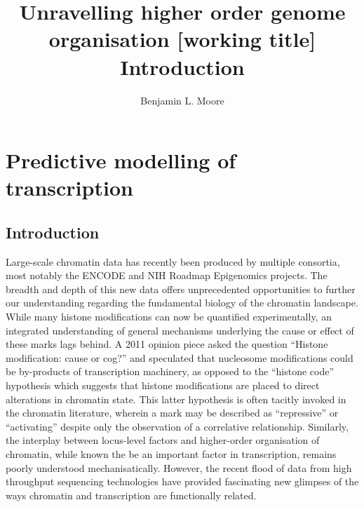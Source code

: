 \documentclass[a4paper,10pt,oneside]{book}
\title{ \vspace{3in} Unravelling higher order genome organisation {\small [working
    title]} \\ \vspace{2em} {\large {\bf Introduction}} }
\author{Benjamin L. Moore}
\begin{document}
\maketitle

\chapter{Predictive modelling of transcription}

\section{Introduction}
Large-scale chromatin data has recently been produced by multiple
consortia, most notably the ENCODE\cite{Gerstein2012} and NIH
Roadmap Epigenomics\cite{Bernstein2010} projects. The breadth and depth of this new
data offers unprecedented opportunities to further our understanding
regarding the fundamental biology of the chromatin landscape. While many histone
modifications can now be quantified experimentally,\cite{Nikolov2012, Sajan2012, Ernst2011} an integrated
understanding of general mechanisms underlying the cause or effect of
these marks lags behind. A 2011 opinion piece asked
the question ``Histone modification: cause or
cog?''\cite{Henikoff2011} and speculated that nucleosome modifications
could be by-products of transcription machinery, as opposed to
the ``histone code'' hypothesis which suggests that histone
modifications are placed to direct alterations in chromatin
state. This latter hypothesis is often tacitly invoked in the
chromatin literature, wherein a mark may be described as
``repressive'' or ``activating'' despite only the observation of a
correlative relationship.\cite{Henikoff2011} Similarly, the interplay
between locus-level factors and higher-order organisation of
chromatin, while known the be an important factor in
transcription, remains poorly understood mechanisatically.\cite{Li2011} 
However, the recent flood of data from high throughput sequencing technologies have provided fascinating new glimpses of the ways chromatin and transcription are functionally related.\\
\end{document}
